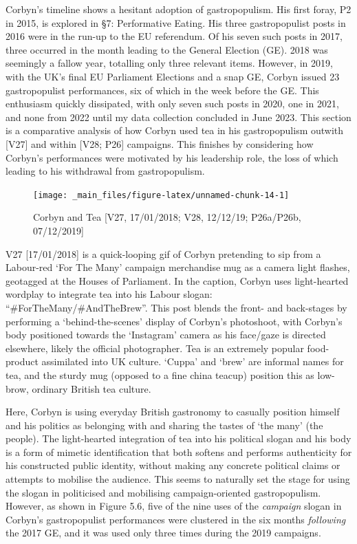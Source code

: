 \documentclass[a4paper, nobind]{templates/ociamthesis}
\begin{document}
Corbyn's timeline shows a hesitant adoption of gastropopulism. His first foray, P2 in 2015, is explored in §7: Performative Eating. His three gastropopulist posts in 2016 were in the run-up to the EU referendum. Of his seven such posts in 2017, three occurred in the month leading to the General Election (GE). 2018 was seemingly a fallow year, totalling only three relevant items. However, in 2019, with the UK's final EU Parliament Elections and a snap GE, Corbyn issued 23 gastropopulist performances, six of which in the week before the GE. This enthusiasm quickly dissipated, with only seven such posts in 2020, one in 2021, and none from 2022 until my data collection concluded in June 2023. This section is a comparative analysis of how Corbyn used tea in his gastropopulism outwith {[}V27{]} and within {[}V28; P26{]} campaigns. This finishes by considering how Corbyn's performances were motivated by his leadership role, the loss of which leading to his withdrawal from gastropopulism.

\begin{figure}
\texttt{[image: \_main\_files/figure-latex/unnamed-chunk-14-1]} \caption{Corbyn and Tea [V27, 17/01/2018; V28, 12/12/19; P26a/P26b, 07/12/2019]}\label{fig:unnamed-chunk-14}
\end{figure}

V27 {[}17/01/2018{]} is a quick-looping gif of Corbyn pretending to sip from a Labour-red `For The Many' campaign merchandise mug as a camera light flashes, geotagged at the Houses of Parliament. In the caption, Corbyn uses light-hearted wordplay to integrate tea into his Labour slogan: ``\#ForTheMany/\#AndTheBrew''. This post blends the front- and back-stages by performing a `behind-the-scenes' display of Corbyn's photoshoot, with Corbyn's body positioned towards the `Instagram' camera as his face/gaze is directed elsewhere, likely the official photographer. Tea is an extremely popular food-product assimilated into UK culture. `Cuppa' and `brew' are informal names for tea, and the sturdy mug (opposed to a fine china teacup) position this as low-brow, ordinary British tea culture.

Here, Corbyn is using everyday British gastronomy to casually position himself and his politics as belonging with and sharing the tastes of `the many' (the people). The light-hearted integration of tea into his political slogan and his body is a form of mimetic identification that both softens and performs authenticity for his constructed public identity, without making any concrete political claims or attempts to mobilise the audience. This seems to naturally set the stage for using the slogan in politicised and mobilising campaign-oriented gastropopulism. However, as shown in Figure 5.6, five of the nine uses of the \emph{campaign} slogan in Corbyn's gastropopulist performances were clustered in the six months \emph{following} the 2017 GE, and it was used only three times during the 2019 campaigns.
\end{document}
